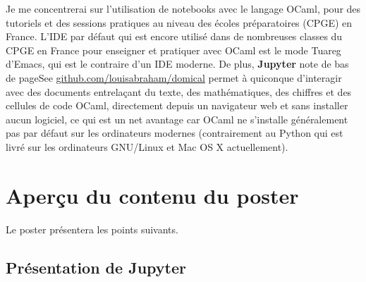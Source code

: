 \documentclass[runningheads]{llncs}
\newcommand{\Jupyter}{\textbf{Jupyter}}
\begin{document}

Je me concentrerai sur l'utilisation de notebooks avec le langage OCaml, pour des tutoriels et des sessions pratiques au niveau des écoles préparatoires (CPGE) en France.
L'IDE par défaut qui est encore utilisé dans de nombreuses classes du CPGE en France pour enseigner et pratiquer avec OCaml est le mode Tuareg d'Emacs, qui est le contraire d'un IDE moderne.
De plus, \Jupyter{} note de bas de page{See \url{github.com/louisabraham/domical}} permet à quiconque d'interagir avec des documents entrelaçant du texte, des mathématiques, des chiffres et des cellules de code OCaml, directement depuis un navigateur web et sans installer aucun logiciel, ce qui est un net avantage car OCaml ne s'installe généralement pas par défaut sur les ordinateurs modernes (contrairement au Python qui est livré sur les ordinateurs GNU/Linux et Mac OS X actuellement).


\section*{Aperçu du contenu du poster}

Le poster présentera les points suivants.


\subsection*{Présentation de \Jupyter}
\end{document}
